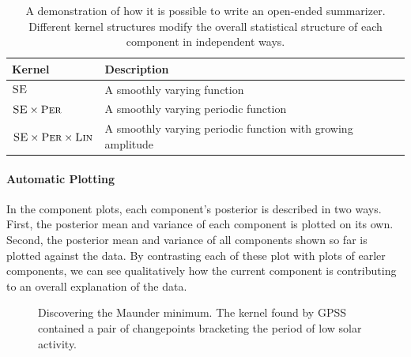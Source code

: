 \documentclass{article} %
\begin{document}
\begin{table}
\begin{tabular}{l|l}
Kernel & Description \\
\midrule
${\textsc{SE}}$ & A smoothly varying function \\
${\textsc{SE}} \times {\textsc{Per}}$ & A smoothly varying periodic function \\
${\textsc{SE}} \times {\textsc{Per}} \times {\textsc{Lin}}$ & A smoothly varying periodic function with growing amplitude \\
\end{tabular}
\caption{A demonstration of how it is possible to write an open-ended summarizer.  Different kernel structures modify the overall statistical structure of each component in independent ways.}
\label{table:descriptions}
\end{table}


\paragraph{Automatic Plotting}
In the component plots, each component's posterior is described in two ways.  First, the posterior mean and variance of each component is plotted on its own.  Second, the posterior mean and variance of all components shown so far is plotted against the data.  By contrasting each of these plot with plots of earler components, we can see qualitatively how the current component is contributing to an overall explanation of the data.

\begin{figure}[h!]
\centering
{}
\caption{Discovering the Maunder minimum.  The kernel found by GPSS contained a pair of changepoints bracketing the period of low solar activity.}
\label{fig:maunder}
\end{figure}
\end{document}
